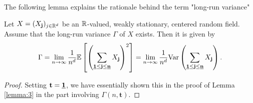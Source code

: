 The following lemma explains the rationale behind the term "long-run variance"
\begin{lemma} \label{lemma long-run variance equation}
    Let $X = (X_\mathbf{j})_{j \in \mathbb{R}^d}$ be an $\mathbb{R}$-valued, weakly stationary, centered random field. Assume that the long-run variance $\Gamma$ of $X$ exists. Then it is given by
    \[ \Gamma = \lim\limits_{n \to \infty} \frac{1}{n^d} \EE{\left( \sum\limits_{\usbf[1] \leq \mathbf{j} \leq \usbf[n]} X_\mathbf{j} \right)^2} = \lim\limits_{n \to \infty} \frac{1}{n^d} \mathrm{Var}\left( \sum\limits_{\usbf[1] \leq \mathbf{j} \leq \usbf[n]} X_\mathbf{j} \right). \]
\end{lemma}
\begin{proof}
    Setting $\mathbf{t} = \usbf[1]$, we have essentially shown this in the proof of Lemma \ref{lemma:3} in the part involving $\Gamma(n, \mathbf{t})$.
\end{proof}
